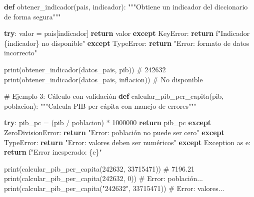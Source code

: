 \documentclass[
  doc,
  floatsintext,
  longtable,
  a4paper,
  nolmodern,
  notxfonts,
  notimes,
  12pt,
  colorlinks=true,linkcolor=blue,citecolor=blue,urlcolor=blue]{apa7}
\newenvironment{Shaded}{\begin{snugshade}}{\end{snugshade}}
\newcommand{\BuiltInTok}[1]{\textcolor[rgb]{0.00,0.23,0.31}{#1}}
\newcommand{\CommentTok}[1]{\textcolor[rgb]{0.37,0.37,0.37}{#1}}
\newcommand{\ControlFlowTok}[1]{\textcolor[rgb]{0.00,0.23,0.31}{\textbf{#1}}}
\newcommand{\DecValTok}[1]{\textcolor[rgb]{0.68,0.00,0.00}{#1}}
\newcommand{\ImportTok}[1]{\textcolor[rgb]{0.00,0.46,0.62}{#1}}
\newcommand{\KeywordTok}[1]{\textcolor[rgb]{0.00,0.23,0.31}{\textbf{#1}}}
\newcommand{\NormalTok}[1]{\textcolor[rgb]{0.00,0.23,0.31}{#1}}
\newcommand{\OperatorTok}[1]{\textcolor[rgb]{0.37,0.37,0.37}{#1}}
\newcommand{\PreprocessorTok}[1]{\textcolor[rgb]{0.68,0.00,0.00}{#1}}
\newcommand{\SpecialCharTok}[1]{\textcolor[rgb]{0.37,0.37,0.37}{#1}}
\newcommand{\SpecialStringTok}[1]{\textcolor[rgb]{0.13,0.47,0.30}{#1}}
\newcommand{\StringTok}[1]{\textcolor[rgb]{0.13,0.47,0.30}{#1}}
\begin{document}
\begin{Shaded}
\begin{Highlighting}[]
\KeywordTok{def}\NormalTok{ obtener\_indicador(pais, indicador):}
    \CommentTok{"""Obtiene un indicador del diccionario de forma segura"""}
    
    \ControlFlowTok{try}\NormalTok{:}
\NormalTok{        valor }\OperatorTok{=}\NormalTok{ pais[indicador]}
        \ControlFlowTok{return}\NormalTok{ valor}
    \ControlFlowTok{except} \PreprocessorTok{KeyError}\NormalTok{:}
        \ControlFlowTok{return} \SpecialStringTok{f"Indicador \textquotesingle{}}\SpecialCharTok{\{}\NormalTok{indicador}\SpecialCharTok{\}}\SpecialStringTok{\textquotesingle{} no disponible"}
    \ControlFlowTok{except} \PreprocessorTok{TypeError}\NormalTok{:}
        \ControlFlowTok{return} \StringTok{"Error: formato de datos incorrecto"}

\BuiltInTok{print}\NormalTok{(obtener\_indicador(datos\_pais, }\StringTok{\textquotesingle{}pib\textquotesingle{}}\NormalTok{))         }\CommentTok{\# 242632}
\BuiltInTok{print}\NormalTok{(obtener\_indicador(datos\_pais, }\StringTok{\textquotesingle{}inflacion\textquotesingle{}}\NormalTok{))   }\CommentTok{\# No disponible}

\CommentTok{\# Ejemplo 3: Cálculo con validación}
\KeywordTok{def}\NormalTok{ calcular\_pib\_per\_capita(pib, poblacion):}
    \CommentTok{"""Calcula PIB per cápita con manejo de errores"""}
    
    \ControlFlowTok{try}\NormalTok{:}
\NormalTok{        pib\_pc }\OperatorTok{=}\NormalTok{ (pib }\OperatorTok{/}\NormalTok{ poblacion) }\OperatorTok{*} \DecValTok{1000000}
        \ControlFlowTok{return}\NormalTok{ pib\_pc}
    \ControlFlowTok{except} \PreprocessorTok{ZeroDivisionError}\NormalTok{:}
        \ControlFlowTok{return} \StringTok{"Error: población no puede ser cero"}
    \ControlFlowTok{except} \PreprocessorTok{TypeError}\NormalTok{:}
        \ControlFlowTok{return} \StringTok{"Error: valores deben ser numéricos"}
    \ControlFlowTok{except} \PreprocessorTok{Exception} \ImportTok{as}\NormalTok{ e:}
        \ControlFlowTok{return} \SpecialStringTok{f"Error inesperado: }\SpecialCharTok{\{}\NormalTok{e}\SpecialCharTok{\}}\SpecialStringTok{"}

\BuiltInTok{print}\NormalTok{(calcular\_pib\_per\_capita(}\DecValTok{242632}\NormalTok{, }\DecValTok{33715471}\NormalTok{))    }\CommentTok{\# 7196.21}
\BuiltInTok{print}\NormalTok{(calcular\_pib\_per\_capita(}\DecValTok{242632}\NormalTok{, }\DecValTok{0}\NormalTok{))           }\CommentTok{\# Error: población...}
\BuiltInTok{print}\NormalTok{(calcular\_pib\_per\_capita(}\StringTok{"242632"}\NormalTok{, }\DecValTok{33715471}\NormalTok{))  }\CommentTok{\# Error: valores...}
\end{Highlighting}
\end{Shaded}
\end{document}

